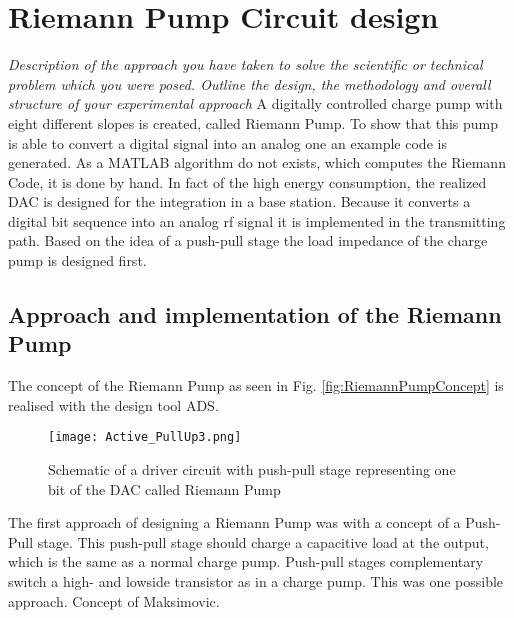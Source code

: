 \chapter{Riemann Pump Circuit design}

\label{ch:design}
\textit{Description of the approach you have taken to solve the scientific or technical problem which you were posed. Outline the design, the methodology and overall structure of your experimental approach}
A digitally controlled charge pump with eight different slopes is created, called Riemann Pump. To show that this pump is able to convert a digital signal into an analog one an example code is generated. As a MATLAB algorithm do not exists, which computes the Riemann Code, it is done by hand.
In fact of the high energy consumption, the realized DAC is designed for the integration in a base station. Because it converts a digital bit sequence into an analog rf signal it is implemented in the transmitting path. Based on the idea of a push-pull stage the load impedance of the charge pump is designed first.
\section{Approach and implementation of the Riemann Pump}
The concept of the Riemann Pump as seen in Fig. \ref{fig:RiemannPumpConcept} is realised with the design tool ADS.

\begin{figure}[ht]
	\centering
  \texttt{[image: Active\_PullUp3.png]}
	\caption{Schematic of a driver circuit with push-pull stage representing one bit of the DAC called Riemann Pump}
	\label{RiemannPump}
\end{figure}

The first approach of designing a Riemann Pump was with a concept of a Push-Pull stage. This push-pull stage should charge a capacitive load at the output, which is the same as a normal charge pump. Push-pull stages complementary switch a high- and lowside transistor as in a charge pump. This was one possible approach. Concept of Maksimovic. 
